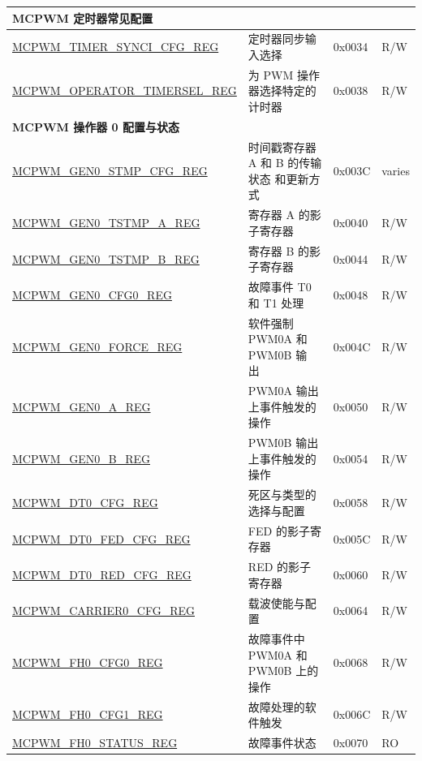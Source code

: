 \begin{longtable}{ | p{6cm} | p{7.2cm} | p{1.2cm} | p{1cm} | }
\multicolumn{4}{|l|}{\textbf{MCPWM 定时器常见配置}} \\ \hline
\hyperref[regdesc:MCPWMTIMERSYNCICFGREG]{MCPWM\_TIMER\_SYNCI\_CFG\_REG} & 定时器同步输入选择 &0x0034 & R/W \\ \hline
\hyperref[regdesc:MCPWMOPERATORTIMERSELREG]{MCPWM\_OPERATOR\_TIMERSEL\_REG} & 为 PWM 操作器选择特定的计时器 & 0x0038 & R/W \\ \hline

\multicolumn{4}{|l|}{\textbf{MCPWM 操作器 0 配置与状态}} \\ \hline
\hyperref[regdesc:MCPWMGEN0STMPCFGREG]{MCPWM\_GEN0\_STMP\_CFG\_REG} & 时间戳寄存器 A 和 B 的传输状态 和更新方式 & 0x003C & varies\\ \hline
\hyperref[regdesc:MCPWMGEN0TSTMPAREG]{MCPWM\_GEN0\_TSTMP\_A\_REG} & 寄存器 A 的影子寄存器 & 0x0040 &  R/W \\ \hline
\hyperref[regdesc:MCPWMGEN0TSTMPBREG]{MCPWM\_GEN0\_TSTMP\_B\_REG} & 寄存器 B 的影子寄存器 & 0x0044 &  R/W \\ \hline
\hyperref[regdesc:MCPWMGEN0CFG0REG]{MCPWM\_GEN0\_CFG0\_REG} & 故障事件 T0 和 T1 处理 & 0x0048 & R/W \\ \hline
\hyperref[regdesc:MCPWMGEN0FORCEREG]{MCPWM\_GEN0\_FORCE\_REG} & 软件强制 PWM0A 和 PWM0B 输 出 & 0x004C & R/W \\ \hline
\hyperref[regdesc:MCPWMGEN0AREG]{MCPWM\_GEN0\_A\_REG} & PWM0A 输出上事件触发的操作 & 0x0050 &  R/W \\ \hline
\hyperref[regdesc:MCPWMGEN0BREG]{MCPWM\_GEN0\_B\_REG} & PWM0B 输出上事件触发的操作 & 0x0054 & R/W \\ \hline
\hyperref[regdesc:MCPWMDT0CFGREG]{MCPWM\_DT0\_CFG\_REG} & 死区与类型的选择与配置 & 0x0058 & R/W \\ \hline
\hyperref[regdesc:MCPWMDT0FEDCFGREG]{MCPWM\_DT0\_FED\_CFG\_REG} & FED 的影子寄存器 & 0x005C & R/W \\ \hline
\hyperref[regdesc:MCPWMDT0REDCFGREG]{MCPWM\_DT0\_RED\_CFG\_REG} & RED 的影子寄存器 & 0x0060 &  R/W \\ \hline
\hyperref[regdesc:MCPWMCARRIER0CFGREG]{MCPWM\_CARRIER0\_CFG\_REG} & 载波使能与配置 & 0x0064 & R/W \\ \hline
\hyperref[regdesc:MCPWMFH0CFG0REG]{MCPWM\_FH0\_CFG0\_REG} & 故障事件中 PWM0A 和 PWM0B 上的操作 & 0x0068 &  R/W \\ \hline
\hyperref[regdesc:MCPWMFH0CFG1REG]{MCPWM\_FH0\_CFG1\_REG} & 故障处理的软件触发 & 0x006C &  R/W \\ \hline
\hyperref[regdesc:MCPWMFH0STATUSREG]{MCPWM\_FH0\_STATUS\_REG} & 故障事件状态 & 0x0070 & RO \\ \hline


\end{longtable}
